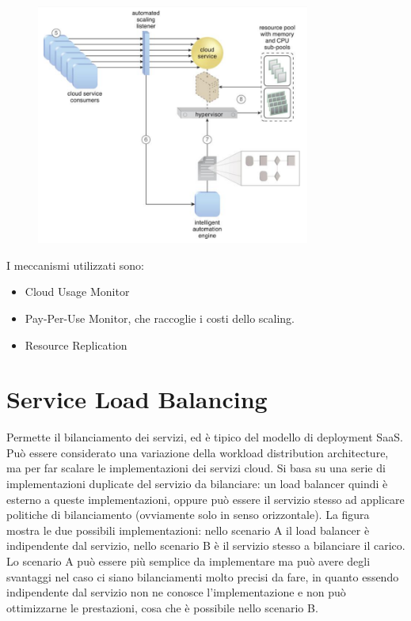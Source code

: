 \begin{figure}[htb!]
    \centering
    \includegraphics[width=9cm]{./Images/cap11/11.3.png}
\end{figure}

I meccanismi utilizzati sono:
\begin{itemize}
    \item Cloud Usage Monitor
    \item Pay-Per-Use Monitor, che raccoglie i costi dello scaling.
    \item Resource Replication
\end{itemize}

\section{Service Load Balancing}
Permette il bilanciamento dei servizi, ed è tipico del modello di deployment SaaS. Può essere considerato una variazione della workload distribution architecture, ma per far scalare le implementazioni dei servizi cloud. Si basa su una serie di implementazioni duplicate del servizio da bilanciare: un load balancer quindi è esterno a queste implementazioni, oppure può essere il servizio stesso ad applicare politiche di bilanciamento (ovviamente solo in senso orizzontale). 
La figura mostra le due possibili implementazioni: nello scenario A il load balancer è indipendente dal servizio, nello scenario B è il servizio stesso a bilanciare il carico. Lo scenario A può essere più semplice da implementare ma può avere degli svantaggi nel caso ci siano bilanciamenti molto precisi da fare, in quanto essendo indipendente dal servizio non ne conosce l'implementazione e non può ottimizzarne le prestazioni, cosa che è possibile nello scenario B.

